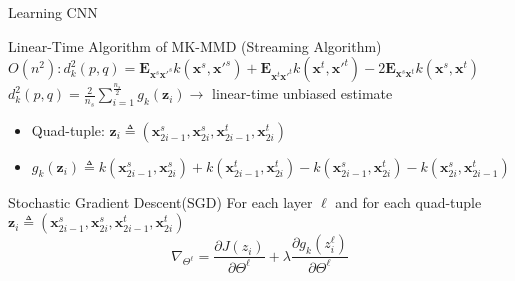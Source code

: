 \documentclass{beamer}
\begin{document}
\begin{frame}[fragile]{Learning CNN}
\begin{block}{Linear-Time Algorithm of MK-MMD (Streaming Algorithm)}
$O(n^2):d_k^2(p,q)=\mathbf{E}_{\mathbf{x}^s\mathbf{x}\prime^s}k(\mathbf{x}^s,\mathbf{x}\prime^s)+\mathbf{E}_{\mathbf{x}^t\mathbf{x}\prime^t}k(\mathbf{x}^t,\mathbf{x}\prime^t)-2\mathbf{E}_{\mathbf{x}^s\mathbf{x}^t}k(\mathbf{x}^s,\mathbf{x}^t)$
$d_k^2(p,q)=\frac{2}{n_s}\sum\nolimits_{i=1}^{\frac{n_s}{2}}g_k(\mathbf{z}_i) \to$ linear-time unbiased estimate
\begin{itemize}
\item{Quad-tuple: $\textbf{z}_i\triangleq (\textbf{x}_{2i-1}^s, \textbf{x}_{2i}^s, \textbf{x}_{2i-1}^t, \textbf{x}_{2i}^t)$}
\item{$g_k(\textbf{z}_i) \triangleq k(\textbf{x}_{2i-1}^s, \textbf{x}_{2i}^s) + k(\textbf{x}_{2i-1}^t, \textbf{x}_{2i}^t) - k(\textbf{x}_{2i-1}^s, \textbf{x}_{2i}^t) - k(\textbf{x}_{2i}^s, \textbf{x}_{2i-1}^t)$}
\end{itemize}
\end{block}
\begin{block}{Stochastic Gradient Descent(SGD)}
For each layer $\ell$ and for each quad-tuple $\textbf{z}_i\triangleq (\textbf{x}_{2i-1}^s, \textbf{x}_{2i}^s, \textbf{x}_{2i-1}^t, \textbf{x}_{2i}^t)$
\begin{equation}
\nabla_{\Theta^\ell}=\frac{\partial{J(z_i)}}{\partial\Theta^\ell}+\lambda\frac{\partial g_k(z_i^\ell)}{\partial \Theta^\ell}
\end{equation}
\end{block}

\end{frame}
\end{document}
